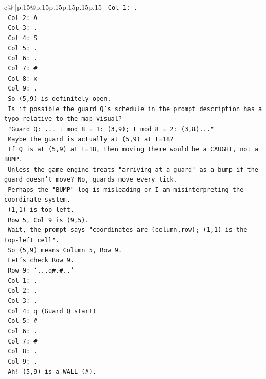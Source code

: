 \documentclass{article}
\begin{document}
{\begin{supertabular}{c@{$\;$}|p{.15\linewidth}@{}p{.15\linewidth}p{.15\linewidth}p{.15\linewidth}p{.15\linewidth}p{.15\linewidth}}
{{{\texttt{  Col 1: .} \\
\texttt{  Col 2: A} \\
\texttt{  Col 3: .} \\
\texttt{  Col 4: S} \\
\texttt{  Col 5: .} \\
\texttt{  Col 6: .} \\
\texttt{  Col 7: \#} \\
\texttt{  Col 8: x} \\
\texttt{  Col 9: .} \\
\texttt{  So (5,9) is definitely open.} \\
\texttt{  Is it possible the guard Q's schedule in the prompt description has a typo relative to the map visual?} \\
\texttt{  "Guard Q: ... t mod 8 = 1: (3,9); t mod 8 = 2: (3,8)..."} \\
\texttt{  Maybe the guard is actually at (5,9) at t=18?} \\
\texttt{  If Q is at (5,9) at t=18, then moving there would be a CAUGHT, not a BUMP.} \\
\texttt{  Unless the game engine treats "arriving at a guard" as a bump if the guard doesn't move? No, guards move every tick.} \\
\texttt{  Perhaps the "BUMP" log is misleading or I am misinterpreting the coordinate system.} \\
\texttt{  (1,1) is top{-}left.} \\
\texttt{  Row 5, Col 9 is (9,5).} \\
\texttt{  Wait, the prompt says "coordinates are (column,row); (1,1) is the top{-}left cell".} \\
\texttt{  So (5,9) means Column 5, Row 9.} \\
\texttt{  Let's check Row 9.} \\
\texttt{  Row 9: `...q\#.\#..`} \\
\texttt{  Col 1: .} \\
\texttt{  Col 2: .} \\
\texttt{  Col 3: .} \\
\texttt{  Col 4: q (Guard Q start)} \\
\texttt{  Col 5: \#} \\
\texttt{  Col 6: .} \\
\texttt{  Col 7: \#} \\
\texttt{  Col 8: .} \\
\texttt{  Col 9: .} \\
\texttt{  Ah! (5,9) is a WALL (\#).} \\
}}}
\end{supertabular}}
\end{document}
